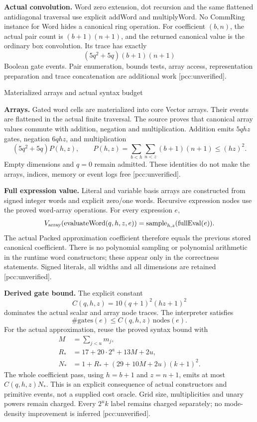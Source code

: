 \documentclass[10pt]{article}
\begin{document}
\textbf{Actual convolution.} Word zero extension, dot recursion and the same
flattened antidiagonal traversal use explicit addWord and multiplyWord.
No CommRing instance for Word hides a canonical ring operation. For coefficient
$(b,n)$, the actual pair count is $(b+1)(n+1)$, and the returned canonical value
is the ordinary box convolution. Its trace has exactly
\[
 (5q^2+5q)(b+1)(n+1)
\]
Boolean gate events. Pair enumeration, bounds tests, array access, representation
preparation and trace concatenation are additional work [pcc:unverified].

\newpage
\begin{center}{\Large Materialized arrays and actual syntax budget}\end{center}
\textbf{Arrays.} Gated word cells are materialized into core Vector arrays.
Their events are flattened in the actual finite traversal. The source proves
that canonical array values commute with addition, negation and multiplication.
Addition emits $5qhz$ gates, negation $6qhz$, and multiplication
\[
 (5q^2+5q)P(h,z),\qquad
 P(h,z)=\sum_{b<h}\sum_{n<z}(b+1)(n+1)\le(hz)^2.
\]
Empty dimensions and $q=0$ remain admitted. These identities do not make the
arrays, indices, memory or event logs free [pcc:unverified].

\textbf{Full expression value.} Literal and variable basis arrays are constructed
from signed integer words and explicit zero/one words. Recursive expression
nodes use the proved word-array operations. For every expression $e$,
\[
 V_{\rm array}(\mathrm{evaluateWord}(q,h,z,e))
 =\mathrm{sample}_{h,z}(\mathrm{fullEval}(e)).
\]
The actual Packed approximation coefficient therefore equals the previous
stored canonical coefficient. There is no polynomial sampling or polynomial
arithmetic in the runtime word constructors; these appear only in the
correctness statements. Signed literals, all widths and all dimensions are
retained [pcc:unverified].

\textbf{Derived gate bound.} The explicit constant
\[
 C(q,h,z)=10(q+1)^2(hz+1)^2
\]
dominates the actual scalar and array node traces. The interpreter satisfies
\[
 \#\mathrm{gates}(e)\le C(q,h,z)\,\mathrm{nodes}(e).
\]
For the actual approximation, reuse the proved syntax bound with
\[
 \begin{aligned}
 M&=\sum_{j<u}m_j,\\
 R_*&=17+20\cdot2^a+13M+2u,\\
 N_*&=1+R_*+(29+10M+2u)(k+1)^2.
 \end{aligned}
\]
The whole coefficient pass, using $h=b+1$ and $z=n+1$, emits at most
$C(q,h,z)N_*$. This is an explicit consequence of actual constructors and
primitive events, not a supplied cost oracle. Grid size, multiplicities and
unary powers remain charged. Every $2^u k$ label remains charged separately;
no mode-density improvement is inferred [pcc:unverified].
\end{document}
